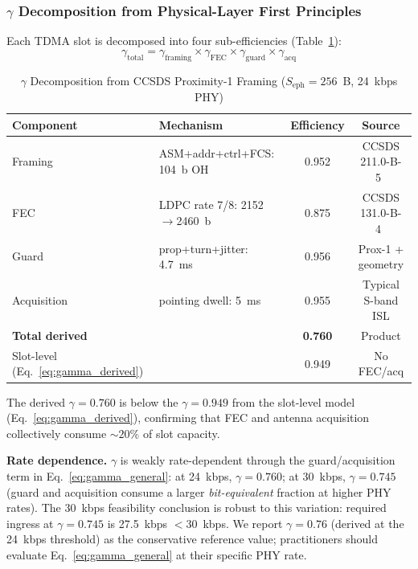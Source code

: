 \documentclass[journal]{IEEEtran}
\begin{document}
\subsubsection{$\gamma$ Decomposition from Physical-Layer First Principles}

Each TDMA slot is decomposed into four sub-efficiencies (Table~\ref{tab:gamma_decomposition}):
\begin{equation}
    \gamma_{\text{total}} = \gamma_{\text{framing}} \times \gamma_{\text{FEC}} \times \gamma_{\text{guard}} \times \gamma_{\text{acq}}
    \label{eq:gamma_decomposition}
\end{equation}

\begin{table}[t]
    \centering
    \caption{$\gamma$ Decomposition from CCSDS Proximity-1 Framing ($S_{\text{eph}} = 256$~B, 24~kbps PHY)}
    \label{tab:gamma_decomposition}
    \footnotesize
    \begin{tabular}{@{}llcc@{}}
        \toprule
        \textbf{Component} & \textbf{Mechanism} & \textbf{Efficiency} & \textbf{Source} \\
        \midrule
        Framing & ASM+addr+ctrl+FCS: 104~b OH & 0.952 & CCSDS 211.0-B-5~\cite{ccsds_prox1} \\
        FEC & LDPC rate 7/8: 2152$\to$2460~b & 0.875 & CCSDS 131.0-B-4~\cite{ccsds_sync_coding} \\
        Guard & prop+turn+jitter: 4.7~ms & 0.956 & Prox-1 + geometry \\
        Acquisition & pointing dwell: 5~ms & 0.955 & Typical S-band ISL \\
        \midrule
        \textbf{Total derived} & & \textbf{0.760} & Product \\
        Slot-level (Eq.~\ref{eq:gamma_derived}) & & 0.949 & No FEC/acq \\
        \bottomrule
    \end{tabular}
\end{table}

The derived $\gamma = 0.760$ is below the $\gamma = 0.949$ from the slot-level model (Eq.~\ref{eq:gamma_derived}), confirming that FEC and antenna acquisition collectively consume ${\sim}20\%$ of slot capacity.

\textbf{Rate dependence.} $\gamma$ is weakly rate-dependent through the guard/acquisition term in Eq.~\ref{eq:gamma_general}: at 24~kbps, $\gamma = 0.760$; at 30~kbps, $\gamma = 0.745$ (guard and acquisition consume a larger \emph{bit-equivalent} fraction at higher PHY rates). The 30~kbps feasibility conclusion is robust to this variation: required ingress at $\gamma = 0.745$ is 27.5~kbps $< 30$~kbps. We report $\gamma = 0.76$ (derived at the 24~kbps threshold) as the conservative reference value; practitioners should evaluate Eq.~\ref{eq:gamma_general} at their specific PHY rate.
\end{document}
